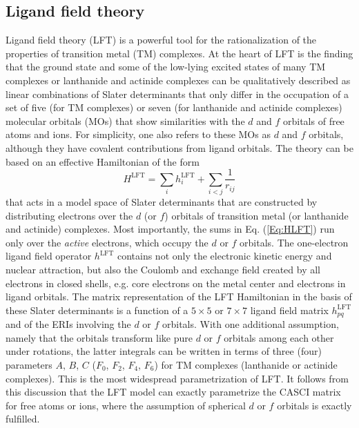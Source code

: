 \subsection{Ligand field theory}
\label{Sec:LFT}
Ligand field theory (LFT) is a powerful tool for the rationalization of the properties of transition metal (TM) complexes. At the heart of LFT is the finding that the ground state and some of the low-lying excited states of many TM complexes or lanthanide and actinide complexes can be qualitatively described as linear combinations of Slater determinants that only differ in the occupation of a set of five (for TM complexes) or seven (for lanthanide and actinide complexes) molecular orbitals (MOs) that show similarities with the $d$ and $f$ orbitals of free atoms and ions. For simplicity, one also refers to these MOs as $d$ and $f$ orbitals, although they have covalent contributions from ligand orbitals. The theory can be based on an effective Hamiltonian of the form\cite{Griff_1971_}
\begin{equation}
\label{Eq:HLFT}
H^\text{LFT} = \sum_i h^\text{LFT}_i + \sum_{i<j}\frac{1}{r_{ij}}
\end{equation}
that acts in a model space of Slater determinants that are constructed by distributing electrons over the $d$ (or $f$) orbitals of transition metal (or lanthanide and actinide) complexes. Most importantly, the sums in Eq. (\ref{Eq:HLFT}) run only over the \emph{active} electrons, which occupy the $d$ or $f$ orbitals.
The one-electron ligand field operator $h^\text{LFT}$ contains not only the electronic kinetic energy and nuclear attraction, but also the Coulomb and exchange field created by all electrons in closed shells, e.g. core electrons on the metal center and electrons in ligand orbitals. The matrix representation of the LFT Hamiltonian in the basis of these Slater determinants is a function of a $5\times 5$ or $7\times 7$ ligand field matrix $h^\text{LFT}_{pq}$ and of the ERIs involving the $d$ or $f$ orbitals. With one additional assumption, namely that the orbitals transform like pure $d$ or $f$ orbitals among each other under rotations, the latter integrals can be written in terms of three (four) parameters $A$, $B$, $C$ ($F_0$, $F_2$, $F_4$, $F_6$) for TM complexes (lanthanide or actinide complexes).\cite{Griff_1971_} This is the most widespread parametrization of LFT. It follows from this discussion that the LFT model can exactly parametrize the CASCI matrix for free atoms or ions, where the assumption of spherical $d$ or $f$ orbitals is exactly fulfilled.


